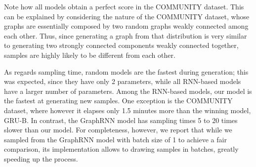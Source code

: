 Note how all models obtain a perfect score in the COMMUNITY dataset. This can be explained by considering the nature of the COMMUNITY dataset, whose graphs are essentially composed by two random graphs weakly connected among each other. Thus, since generating a graph from that distribution is very similar to generating two strongly connected components weakly connected together, samples are highly likely to be different from each other.

As regards sampling time, random models are the fastest during generation; this was expected, since they have only 2 parameters, while all RNN-based models have a larger number of parameters. Among the RNN-based models, our model is the fastest at generating new samples. One exception is the COMMUNITY dataset, where however it elapses only 1.5 minutes more than the winning model, GRU-B. In contrast, the GraphRNN model has sampling times 5 to 20 times slower than our model. For completeness, however, we report that while we sampled from the GraphRNN model with batch size of 1 to achieve a fair comparison, its implementation allows to drawing samples in batches, greatly speeding up the process.

% 

